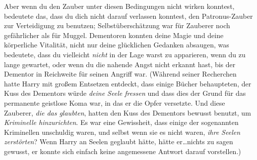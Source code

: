 Aber wenn du den Zauber unter diesen Bedingungen nicht wirken konntest, bedeutete das, dass du dich nicht darauf verlassen konntest, den Patronus-Zauber zur Verteidigung zu benutzen; Selbstüberschätzung war für Zauberer noch gefährlicher als für Muggel. Dementoren konnten deine Magie und deine körperliche Vitalität, nicht nur deine glücklichen Gedanken absaugen, was bedeutete, dass du vielleicht \emph{nicht} in der Lage warst zu apparieren, wenn du zu lange gewartet, oder wenn du die nahende Angst nicht erkannt hast, bis der Dementor in Reichweite für seinen Angriff war. (Während seiner Recherchen hatte Harry mit großem Entsetzen entdeckt, dass einige Bücher behaupteten, der Kuss des Dementors würde \emph{deine Seele fressen} und dass dies der Grund für das permanente geistlose Koma war, in das er die Opfer versetzte. Und diese Zauberer, \emph{die das glaubten}, hatten den Kuss des Dementors bewusst benutzt, um \emph{Kriminelle hinzurichten}. Es war eine Gewissheit, dass einige der sogenannten Kriminellen unschuldig waren, und selbst wenn sie es nicht waren, \emph{ihre Seelen zerstörten}? Wenn Harry an Seelen geglaubt hätte, hätte er…nichts zu sagen gewusst, er konnte sich einfach keine angemessene Antwort darauf vorstellen.)


